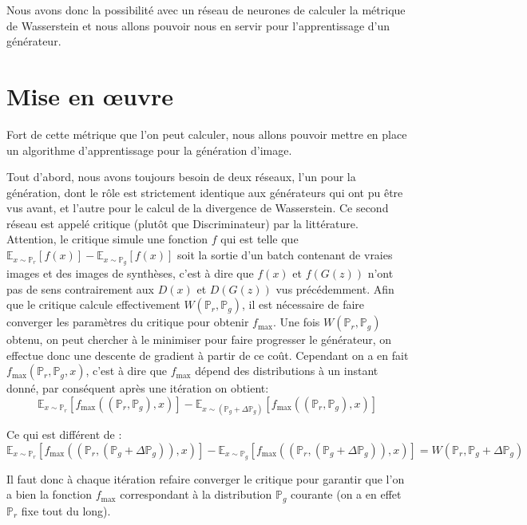 Nous avons donc la possibilité avec un réseau de neurones de calculer la métrique de Wasserstein et nous allons pouvoir nous en servir pour l'apprentissage d'un générateur.

\section{Mise en œuvre}

Fort de cette métrique que l'on peut calculer, nous allons pouvoir mettre en place un algorithme d'apprentissage pour la génération d'image.

Tout d'abord, nous avons toujours besoin de deux réseaux, l'un pour la génération, dont le rôle est strictement identique aux générateurs qui ont pu être vus avant, et l'autre pour le calcul de la divergence de Wasserstein. Ce second réseau est appelé critique (plutôt que Discriminateur) par la littérature. Attention, le critique simule une fonction $f$ qui est telle que $\mathbb{E}_{x\sim\mathbb{P}_r}[f(x)] - \mathbb{E}_{x\sim\mathbb{P}_g}[f(x)] $ soit la sortie d'un batch contenant de vraies images et des images de synthèses, c'est à dire que $f(x)$ et $f(G(z))$ n'ont pas de sens contrairement aux $D(x)$ et $D(G(z))$ vus précédemment. 
Afin que le critique calcule effectivement $W(\mathbb{P}_r, \mathbb{P}_g)$, il est nécessaire de faire converger les paramètres du critique pour obtenir $f_{\text{max}}$. Une fois $W(\mathbb{P}_r, \mathbb{P}_g)$ obtenu, on peut chercher à le minimiser pour faire progresser le générateur, on effectue donc une descente de gradient à partir de ce coût. Cependant on a en fait $f_{\text{max}}(\mathbb{P}_r, \mathbb{P}_g, x)$, c'est à dire que $f_{\text{max}}$ dépend des distributions à un instant donné, par conséquent après une itération on obtient:
 \[\mathbb{E}_{x\sim\mathbb{P}_r}[f_\text{max}((\mathbb{P}_r, \mathbb{P}_g), x)] - \mathbb{E}_{x\sim\left(\mathbb{P}_g+\Delta\mathbb{P}_g\right)}[f_\text{max}((\mathbb{P}_r, \mathbb{P}_g), x)] \]

Ce qui est différent de :
 \[ \mathbb{E}_{x\sim\mathbb{P}_r}[f_\text{max}((\mathbb{P}_r, \left(\mathbb{P}_g+\Delta\mathbb{P}_g\right)), x)] - \mathbb{E}_{x\sim \mathbb{P}_g}[f_\text{max}((\mathbb{P}_r, \left(\mathbb{P}_g+\Delta\mathbb{P}_g\right)), x)] = W(\mathbb{P}_r, \mathbb{P}_g+\Delta\mathbb{P}_g)\]

 Il faut donc à chaque itération refaire converger le critique pour garantir que l'on a bien la fonction $f_{\text{max}}$ correspondant à la distribution $\mathbb{P}_g$ courante (on a en effet $\mathbb{P}_r$ fixe tout du long).

